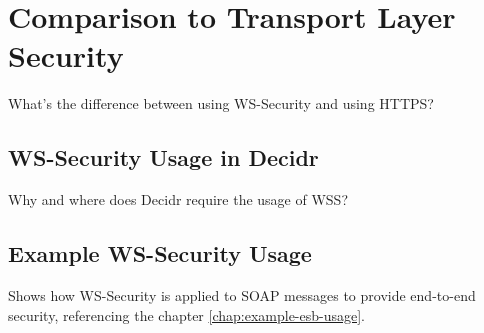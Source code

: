 \section{Comparison to Transport Layer Security}
\label{sec:comparison-to-transport-layer-securtiy}
What's the difference between using WS-Security and using HTTPS?

\subsection{WS-Security Usage in Decidr}
\label{subsec:ws-security-usage-in-decidr}
Why and where does Decidr require the usage of WSS?

\subsection{Example WS-Security Usage}
\label{subsec:example-ws-security-usage}
Shows how WS-Security is applied to SOAP messages to provide end-to-end
security, referencing the chapter \ref{chap:example-esb-usage}. 
